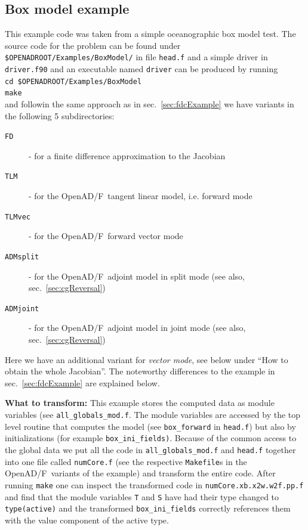 \documentclass{book}
\newcommand{\OpenADF}{OpenAD/F}
\newcommand{\refsec}[1]{{sec.~\ref{#1}}}
\begin{document}
\subsection{Box model example}\label{sec:boxModelExample}
This example code was taken from a simple oceanographic box model test. 
The source code for the problem can be found under \lstinline{$OPENADROOT/Examples/BoxModel/}%
in file \lstinline{head.f} and a simple driver in \lstinline{driver.f90} and an executable named \lstinline{driver} can be 
produced by running\\[1ex] 
\hspace*{.3cm}\lstinline{cd $OPENADROOT/Examples/BoxModel}\\ %
\hspace*{.3cm}\lstinline{make}\\[1ex]
and followin the same approach as in \refsec{sec:fdcExample} we have 
variants in the following 5 subdirectories:
\begin{description}
\item[\tt FD] - for a finite difference approximation to the Jacobian
\item[\tt TLM] - for the  \OpenADF\ tangent linear model, i.e. forward mode
\item[\tt TLMvec] - for the  \OpenADF\ forward vector mode 
\item[\tt ADMsplit] - for the \OpenADF\ adjoint model in split mode (see also, \refsec{sec:cgReversal})
\item[\tt ADMjoint] - for the \OpenADF\ adjoint model in joint mode (see also, \refsec{sec:cgReversal})
\end{description}
Here we have an 
additional variant for {\em vector mode}, see below under ``How to obtain the whole Jacobian''. 
The noteworthy differences to the example in \refsec{sec:fdcExample} are explained below.
 
\noindent
{\bf What to transform:} This example stores the computed data as module variables (see \lstinline{all_globals_mod.f}.
The module variables are accessed by the top level routine that computes the model (see \lstinline{box_forward} in 
\lstinline{head.f})  but also by initializations  (for example \lstinline{box_ini_fields)}.
Because of the common access to the global data we put all the code in \lstinline{all_globals_mod.f} and 
\lstinline{head.f} together into one file called \lstinline{numCore.f} (see the respective \lstinline{Makefile}s 
in the \OpenADF\ variants of the example)  and transform the entire code. 
After running \lstinline{make} one can inspect the transformed code in \lstinline{numCore.xb.x2w.w2f.pp.f}
and find that the module variables \lstinline{T} and \lstinline{S} have had their type changed to 
\lstinline{type(active)} and the 
transformed \lstinline{box_ini_fields} correctly references them with the value component of the active type. 
\end{document}
